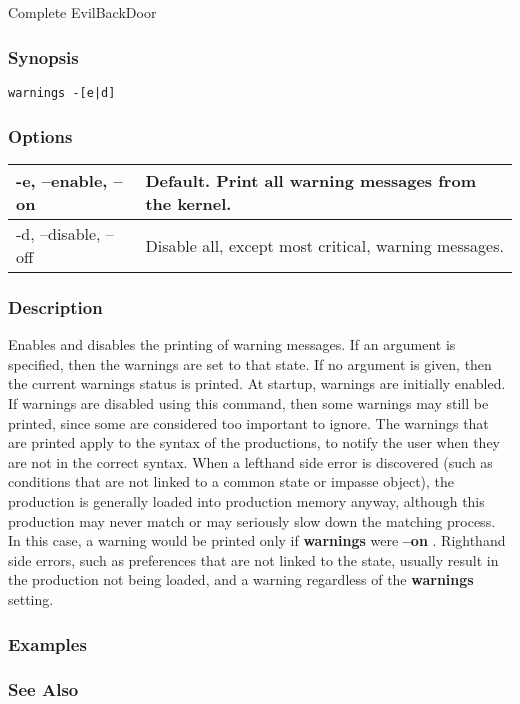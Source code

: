 \subsection{}
\label{warnings}
 Complete EvilBackDoor
\subsubsection*{Synopsis}
\begin{verbatim}
warnings -[e|d]
\end{verbatim}
\subsubsection*{Options}
\begin{tabular}{|l|l|}
\hline 
 -e, --enable, --on  & Default. Print all warning messages from the kernel.  \\
 \hline 
 -d, --disable, --off  & Disable all, except most critical, warning messages.  \\
 \hline 
\end{tabular}
\subsubsection*{Description}
 Enables and disables the printing of warning messages. If an argument is specified, then the warnings are set to that state. If no argument is given, then the current warnings status is printed. At startup, warnings are initially enabled. If warnings are disabled using this command, then some warnings may still be printed, since some are considered too important to ignore. 
 The warnings that are printed apply to the syntax of the productions, to notify the user when they are not in the correct syntax. When a lefthand side error is discovered (such as conditions that are not linked to a common state or impasse object), the production is generally loaded into production memory anyway, although this production may never match or may seriously slow down the matching process. In this case, a warning would be printed only if \textbf{warnings}
 were \textbf{--on}
. Righthand side errors, such as preferences that are not linked to the state, usually result in the production not being loaded, and a warning regardless of the \textbf{warnings}
 setting. 
\subsubsection*{Examples}
\subsubsection*{See Also}
